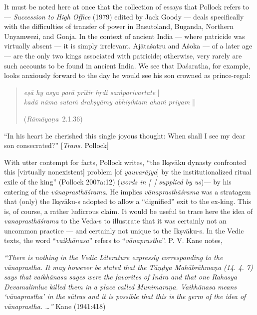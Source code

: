 It must be noted here at once that the collection of essays that Pollock refers to --- {\sl Succession to High Office} (1979) edited by Jack Goody --- deals specifically with the difficulties of transfer of power in Basutoland, Buganda, Northern Unyamwezi, and Gonja. In the context of ancient India --- where patricide was virtually absent --- it is simply irrelevant. Ajātaśatru and Aśoka — of a later age — are the only two kings associated with patricide; otherwise, very rarely are such accounts to be found in ancient India. We see that Daśaratha, for example, looks anxiously forward to the day he would see his son crowned as prince-regal:
\begin{quote}
{{\sl eṣā hy asya parā prītir hṛdi saṁparivartate}} |\\
{{\sl kadā nāma sutaṁ drakṣyāmy abhiṣiktam ahaṁ priyam}} || 

\hfill({{\sl Rāmāyaṇa}}\relax \ 2.1.36)
\end{quote}

\begin{myquote}
“In his heart he cherished this single joyous thought: When shall I see my dear son consecrated?” [{\sl Trans.} Pollock]
\end{myquote}

With utter contempt for facts, Pollock writes, “the Ikṣvāku dynasty confronted this [virtually nonexistent] problem [of {\sl yauvarājya}] by the institutionalized ritual exile of the king” (Pollock 2007a:12) ({\sl words in [~] supplied by us})--- by his entering of the {\sl vānaprasthāśrama}. He implies {\sl vānaprasthāśrama} was a stratagem that (only) the  Ikṣvāku-s adopted to allow a “dignified” exit to the ex-king. This is, of course, a rather ludicrous claim. It would be useful to trace here the idea of {\sl vanaprasthāśrama} to the \hbox{Veda-s} to illustrate that it was certainly not an uncommon practice --- and certainly not unique to the Ikṣvāku-s. In the Vedic texts, the word “{\sl vaikhānasa}” refers to “{\sl vānaprastha}”. P. V. Kane notes, 

\begin{myquote}
{{\sl “There is nothing in the Vedic Literature expressly corresponding to the vānaprastha. It may however be stated that the Tāṇḍya Mahābrāhmaṇa (14. 4. 7) says that {\sl vaikhānasa} sages were the favorites of Indra and that one Rahasya Devamalimluc killed them in a place called Munimaraṇa. Vaikhānasa means ‘vānaprastha’ in the sūtras and it is possible that this is the germ of the idea of vānaprastha. …”}}
\hfill  Kane (1941:418)
\end{myquote}

